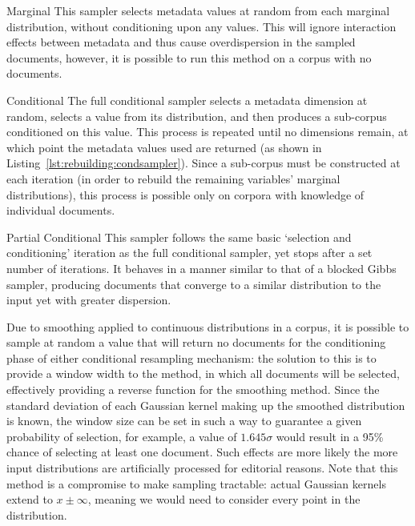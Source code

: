 \begin{itemizeTitle}
    \item[Marginal] This sampler selects metadata values at random from each marginal distribution, without conditioning upon any values.  This will ignore interaction effects between metadata and thus cause overdispersion in the sampled documents, however, it is possible to run this method on a corpus with no documents.

    \item[Conditional] The full conditional sampler selects a metadata dimension at random, selects a value from its distribution, and then produces a sub-corpus conditioned on this value.  This process is repeated until no dimensions remain, at which point the metadata values used are returned (as shown in Listing~\ref{lst:rebuilding:condsampler}).  Since a sub-corpus must be constructed at each iteration (in order to rebuild the remaining variables' marginal distributions), this process is possible only on corpora with knowledge of individual documents.
    
    \item[Partial Conditional] This sampler follows the same basic `selection and conditioning' iteration as the full conditional sampler, yet stops after a set number of iterations.  It behaves in a manner similar to that of a blocked Gibbs sampler, producing documents that converge to a similar distribution to the input yet with greater dispersion.
\end{itemizeTitle}

Due to smoothing applied to continuous distributions in a corpus, it is possible to sample at random a value that will return no documents for the conditioning phase of either conditional resampling mechanism: the solution to this is to provide a window width to the method, in which all documents will be selected, effectively providing a reverse function for the smoothing method.  Since the standard deviation of each Gaussian kernel making up the smoothed distribution is known, the window size can be set in such a way to guarantee a given probability of selection, for example, a value of $1.645\sigma$ would result in a 95\% chance of selecting at least one document.  Such effects are more likely the more input distributions are artificially processed for editorial reasons.  Note that this method is a compromise to make sampling tractable: actual Gaussian kernels extend to $x \pm \infty$, meaning we would need to consider every point in the distribution.


